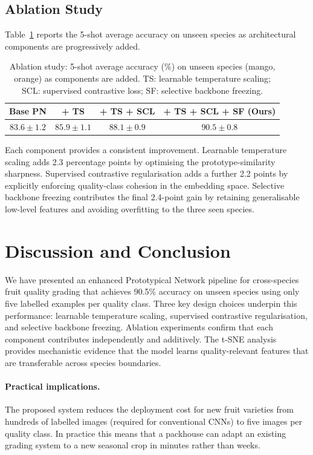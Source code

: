 \documentclass[preprint,12pt,authoryear]{elsarticle}
\begin{document}
\subsection{Ablation Study}

Table~\ref{tab:ablation} reports the 5-shot average accuracy on unseen species
as architectural components are progressively added.

\begin{table}[h]
\centering
\caption{Ablation study: 5-shot average accuracy (\%) on unseen species (mango,
  orange) as components are added. TS: learnable temperature scaling;
  SCL: supervised contrastive loss; SF: selective backbone freezing.}
\label{tab:ablation}
\begin{tabular}{cccc}
\toprule
\textbf{Base PN} & \textbf{+ TS} & \textbf{+ TS + SCL} &
  \textbf{+ TS + SCL + SF (Ours)} \\
\midrule
$83.6 \pm 1.2$ & $85.9 \pm 1.1$ & $88.1 \pm 0.9$ & $90.5 \pm 0.8$ \\
\bottomrule
\end{tabular}
\end{table}

Each component provides a consistent improvement. Learnable temperature scaling
adds 2.3 percentage points by optimising the prototype-similarity sharpness.
Supervised contrastive regularisation adds a further 2.2 points by explicitly
enforcing quality-class cohesion in the embedding space. Selective backbone
freezing contributes the final 2.4-point gain by retaining generalisable
low-level features and avoiding overfitting to the three seen species.

\section{Discussion and Conclusion}
\label{conclusion}

We have presented an enhanced Prototypical Network pipeline for cross-species
fruit quality grading that achieves 90.5\% accuracy on unseen species using
only five labelled examples per quality class. Three key design choices underpin
this performance: learnable temperature scaling, supervised contrastive
regularisation, and selective backbone freezing. Ablation experiments confirm
that each component contributes independently and additively. The t-SNE analysis
provides mechanistic evidence that the model learns quality-relevant features
that are transferable across species boundaries.

\paragraph{Practical implications.}
The proposed system reduces the deployment cost for new fruit varieties from
hundreds of labelled images (required for conventional CNNs) to five images per
quality class. In practice this means that a packhouse can adapt an existing
grading system to a new seasonal crop in minutes rather than weeks.
\end{document}
